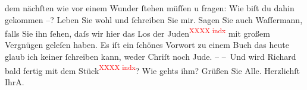 \begin{ledgroupsized}[t]{13cm}
                  {\pb}dem nächſten wie vor einem Wunder ſtehen müſſen u
               fragen: Wie biſt du dahin gekommen –?\pend
           \pstart
           Leben Sie wohl und ſchreiben Sie mir.\pend
           \pstart
           Sagen Sie auch Waſſermann, falls Sie ihn ſehen,
               daſs wir hier das Los der Juden\textcolor{red}{\textsuperscript{XXXX indx}} mit großem
               Vergnügen geleſen haben. Es iſt ein ſchönes Vorwort zu einem Buch das heute glaub ich
               keiner ſchreiben kann, weder Chriſt noch Jude. –\pend
           \pstart
           – Und wird Richard bald {\pb}fertig mit dem Stück\textcolor{red}{\textsuperscript{XXXX indx}}? Wie gehts ihm?\pend
           \pstart
            Grüßen Sie Alle.\pend
           \pstart Herzlichſt Ihr\spacefill\mbox{A.}\pend{}
         
         \endnumbering{}\end{ledgroupsized}  \newcommand{\dateiname}{L01424}\newcommand{\titel}{Arthur Schnitzler an Hugo von Hofmannsthal, 9. 8. 1904}\newcommand{\editorInnen}{ Martin Anton Müller und Gerd-Hermann Susen}
      